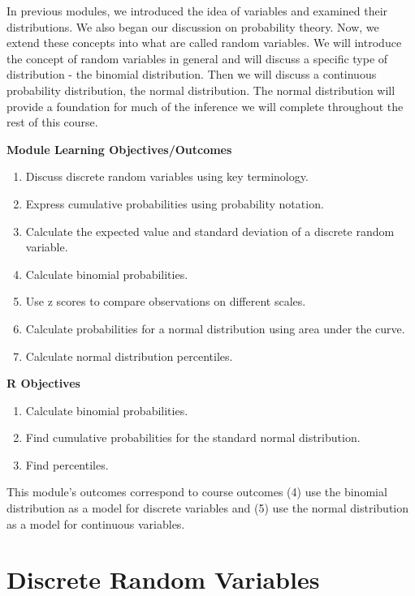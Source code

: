 \documentclass[
]{book}
\providecommand{\tightlist}{%
  \setlength{\itemsep}{0pt}\setlength{\parskip}{0pt}}
\begin{document}
In previous modules, we introduced the idea of variables and examined their distributions. We also began our discussion on probability theory. Now, we extend these concepts into what are called random variables. We will introduce the concept of random variables in general and will discuss a specific type of distribution - the binomial distribution. Then we will discuss a continuous probability distribution, the normal distribution. The normal distribution will provide a foundation for much of the inference we will complete throughout the rest of this course.

\textbf{Module Learning Objectives/Outcomes}

\begin{enumerate}
\def\labelenumi{\arabic{enumi}.}
\tightlist
\item
  Discuss discrete random variables using key terminology.
\item
  Express cumulative probabilities using probability notation.
\item
  Calculate the expected value and standard deviation of a discrete random variable.
\item
  Calculate binomial probabilities.
\item
  Use z scores to compare observations on different scales.
\item
  Calculate probabilities for a normal distribution using area under the curve.
\item
  Calculate normal distribution percentiles.
\end{enumerate}

\textbf{R Objectives}

\begin{enumerate}
\def\labelenumi{\arabic{enumi}.}
\tightlist
\item
  Calculate binomial probabilities.
\item
  Find cumulative probabilities for the standard normal distribution.
\item
  Find percentiles.
\end{enumerate}

This module's outcomes correspond to course outcomes (4) use the binomial distribution as a model for discrete variables and (5) use the normal distribution as a model for continuous variables.

\section{Discrete Random Variables}\label{discrete-random-variables}
\end{document}
